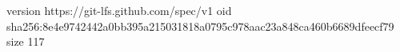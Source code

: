 version https://git-lfs.github.com/spec/v1
oid sha256:8e4e9742442a0bb395a215031818a0795c978aac23a848ca460b6689dfeecf79
size 117
